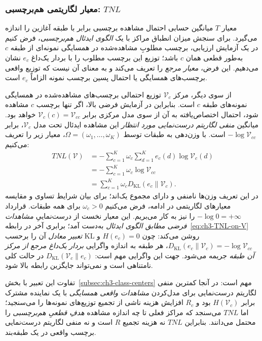 \subsubsection{معیار لگاریتمی هم‌برچسبی: \texorpdfstring{$TNL$}{TNL}}
\label{subsubsec:ch3-TNL}
معیار $T$ میانگین حسابی احتمال مشاهده برچسبی برابر با طبقه آغازین را اندازه می‌گیرد. برای سنجش میزان انطباق مراکز با یک \emph{الگوی ایدئال هم‌برچسبی}، فرض کنیم در یک آزمایش ارزیابی، برچسب مطلوبِ مشاهده‌شده در همسایگی نمونه‌ای از طبقه $c$ به‌طور قطعی همان $c$ باشد؛ توزیع این برچسب مطلوب را با بردار یک‌داغ $e_c$ نشان می‌دهیم. این فرض، \emph{معیار مرجع} را تعریف می‌کند و به معنای آن نیست که توزیع واقعی برچسب‌های همسایگی یا احتمال پسین برچسب نمونه الزاماً $e_c$ است.

از سوی دیگر، مرکز $\mathcal V_c$ توزیع احتمالی برچسب‌های مشاهده‌شده در همسایگی نمونه‌های طبقه $c$ است. بنابراین در آزمایش فرضی بالا، اگر تنها برچسب $c$ مشاهده شود، احتمال اختصاص‌یافته به آن از سوی مدل مرکزی برابر $\mathcal V_c(c)=\mathcal V_{cc}$ خواهد بود. میانگین \emph{منفی لگاریتم درست‌نمایی مورد انتظار} این مشاهده ایدئال تحت مدل $\mathcal V_c$، برابر $-\log\mathcal V_{cc}$ است. با وزن‌دهی به طبقات توسط $\Omega=(\omega_1,\ldots,\omega_K)$، معیار زیر را تعریف می‌کنیم:
\begin{equation}\label{eq:ch3-TNL-on-V}
\boxed{
\begin{aligned}
TNL(\mathcal V)
&=-\sum_{c=1}^{K}\omega_c
\sum_{d=1}^{K}e_c(d)\log\mathcal V_c(d)\\
&=-\sum_{c=1}^{K}\omega_c\log\mathcal V_{cc}\\
&=\sum_{c=1}^{K}\omega_c
D_{\mathrm{KL}}(e_c\|\mathcal V_c).
\end{aligned}}
\end{equation}
در این تعریف وزن‌ها نامنفی و دارای مجموع یک‌اند؛
برای بیان شرایط تساوی و مقایسه معیارهای لگاریتمی
در ادامه، فرض می‌کنیم $\omega_c>0$ برای همه طبقات.
قرارداد $-\log0=+\infty$ را نیز به کار می‌بریم.
این معیار نخست از درست‌نماییِ \emph{مشاهدات فرضی
مطابق الگوی ایدئال} به‌دست آمد؛
برابری آخر در رابطه~\eqref{eq:ch3-TNL-on-V}
\emph{تعبیر معادل} آن را برحسب KL روشن می‌کند:
چون $H(e_c)=0$ و
$D_{\mathrm{KL}}(e_c\|\mathcal V_c)
=-\log\mathcal V_{cc}$،
هر طبقه به اندازه واگرایی
\emph{بردار یک‌داغ مرجع از مرکز آن طبقه}
جریمه می‌شود. جهت این واگرایی مهم است:
$D_{\mathrm{KL}}(\mathcal V_c\|e_c)$
در حالت کلی نامتناهی است و نمی‌تواند
جایگزین رابطه بالا شود.

تفاوت این تعبیر با بخش~\ref{subsec:ch3-class-centers} مهم است: در آنجا کمترین منفی لگاریتم درست‌نمایی برای مدل‌کردن \emph{مشاهدات واقعی همسایگی} با یک نماینده مشترک برابر $H(\mathcal V_c)$ بود و $R_c$ افزایش هزینه ناشی از تجمیع توزیع‌های نمونه‌ها را می‌سنجید؛ اما $TNL$ می‌سنجد که مراکز فعلی تا چه اندازه مشاهده \emph{هدفِ قطعیِ هم‌برچسبی} را محتمل می‌دانند. بنابراین $TNL$ نه هزینه تجمیع $R$ است و نه منفی لگاریتم درست‌نمایی برچسب واقعی در یک طبقه‌بند.

